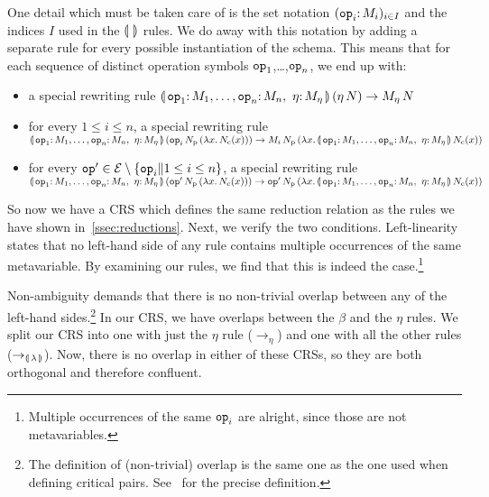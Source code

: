 \documentclass{llncs}
\begin{document}
One detail which must be taken care of is the set notation
$(\onto{\op{op}_i}{M_i})_{i \in I}$ and the indices $I$ used in the
$\llparenthesis \,  \, \rrparenthesis$ rules. We do away with this notation by adding a separate rule
for every possible instantiation of the schema. This means that for each
sequence of distinct operation symbols $\mathtt{op}_1$,\ldots,$\mathtt{op}_n$, we
end up with:
\begin{itemize}
\item a special rewriting rule
  $\ap{\banana{\onto{\op{op}_1}{M_1},\ldots,\onto{\op{op}_n}{M_n},\ 
    \onto{\eta}{M_\eta}}}{(\etaE{N})}
  \to \ap{M_\eta}{N}$
\item for every $1 \le i \le n$, a special rewriting rule \\
  $\ap{\banana{\onto{\op{op}_1}{M_1},\ldots,\onto{\op{op}_n}{M_n},\ 
    \onto{\eta}{M_\eta}}}{(\app{\op{op}_i}{N_{\mathrm{p}}}{(\lam{x}{N_{\mathrm{c}}(x)})})}
  \\ \to
  \app{M_i}{N_{\mathrm{p}}}{(\lam{x}{\ap{\banana{\onto{\op{op}_1}{M_1},\ldots,\onto{\op{op}_n}{M_n},\ \onto{\eta}{M_\eta}}}{N_{\mathrm{c}}(x)}})}$
\item for every $\mathtt{op}' \in \mathcal{E} \setminus \{\mathtt{op}_i \| 1 \le i \le n\}$, a special
  rewriting rule \\
  $\ap{\banana{\onto{\op{op}_1}{M_1},\ldots,\onto{\op{op}_n}{M_n},\ 
    \onto{\eta}{M_\eta}}}{(\app{\op{op}'}{N_{\mathrm{p}}}{(\lam{x}{N_{\mathrm{c}}(x)})})}
  \\ \to
  \app{\op{op}'}{N_{\mathrm{p}}}{(\lam{x}{\ap{\banana{\onto{\op{op}_1}{M_1},\ldots,\onto{\op{op}_n}{M_n},\ \onto{\eta}{M_\eta}}}{N_{\mathrm{c}}(x)}})}$
\end{itemize}

So now we have a CRS which defines the same reduction relation as the rules
we have shown in~\ref{ssec:reductions}. Next, we verify the two
conditions. Left-linearity states that no left-hand side of any rule
contains multiple occurrences of the same metavariable. By examining our
rules, we find that this is indeed the case.\footnote{Multiple occurrences
  of the same $\mathtt{op}_i$ are alright, since those are not metavariables.}

Non-ambiguity demands that there is no non-trivial overlap between any of
the left-hand sides.\footnote{The definition of (non-trivial) overlap is
  the same one as the one used when defining critical
  pairs. See~\cite{klop1993combinatory} for the precise definition.} In our
CRS, we have overlaps between the $\beta$ and the $\eta$ rules. We split
our CRS into one with just the $\eta$ rule ($\to_\eta$) and one with all
the other rules ($\to_{\llparenthesis \, \lambda \, \rrparenthesis}$). Now, there is no overlap in
either of these CRSs, so they are both orthogonal and therefore confluent.
\end{document}
